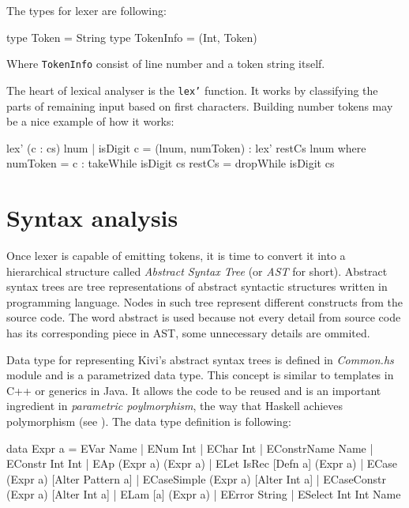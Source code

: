 \documentclass[12pt,a4paper]{report}
\begin{document}
The types for lexer are following:

\vspace*{0.2in}
\begin{code}
type Token = String
type TokenInfo = (Int, Token)
\end{code}

Where \texttt{TokenInfo} consist of line number and a token string itself.

The heart of lexical analyser is the \texttt{lex'} function. It works by
classifying the parts of remaining input based on first characters.  Building
number tokens may be a nice example of how it works:

\vspace*{0.2in}
\begin{code}[label=lst:lex_comment,caption={Building tokens from numbers.}]
lex' (c : cs) lnum | isDigit c =
    (lnum, numToken) : lex' restCs lnum
    where
        numToken = c : takeWhile isDigit cs
        restCs = dropWhile isDigit cs
\end{code}


\section{Syntax analysis}
\label{sec:syntax_analysis}
Once lexer is capable of emitting tokens, it is time to convert it into a
hierarchical structure called \textit{Abstract Syntax Tree} (or \textit{AST}
for short). Abstract syntax trees are tree representations of abstract
syntactic structures written in programming language. Nodes in such tree
represent different constructs from the source code. The word abstract is used
because not every detail from source code has its corresponding piece in AST,
some unnecessary details are ommited.

Data type for representing Kivi's abstract syntax trees is defined in
\textit{Common.hs} module and is a parametrized data type. This concept is
similar to templates in C++ or generics in Java. It allows the code to be
reused and is an important ingredient in \textit{parametric poylmorphism}, the
way that Haskell achieves polymorphism (see
\cite{website:parametric_polymorphism}). The data type definition is following:

\vspace*{0.2in}
\begin{code}
data Expr a = EVar Name
            | ENum Int
            | EChar Int
            | EConstrName Name
            | EConstr Int Int
            | EAp (Expr a) (Expr a)
            | ELet IsRec [Defn a] (Expr a)
            | ECase (Expr a) [Alter Pattern a]
            | ECaseSimple (Expr a) [Alter Int a]
            | ECaseConstr (Expr a) [Alter Int a]
            | ELam [a] (Expr a)
            | EError String
            | ESelect Int Int Name
\end{code}
\end{document}
